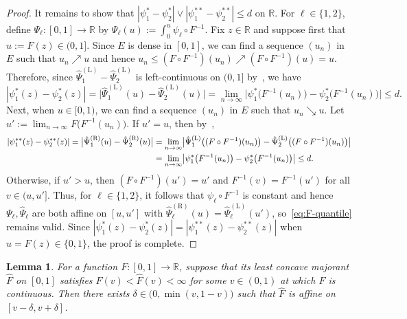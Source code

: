 \documentclass[a4paper]{article}
\newcommand{\R}{\mathbb{R}}
\newtheorem{lemma}[theorem]{Lemma}
\theoremstyle{definition}
\begin{document}
\begin{proof}
It remains to show that $|\psi_1^* - \psi_2^*| \vee |\psi_1^{**} - \psi_2^{**}| \leq d$ on $\R$. For $\ell \in \{1,2\}$, define $\Psi_\ell \colon [0,1] \to \R$ by $\Psi_\ell(u) := \int_0^u \psi_\ell \circ F^{-1}$. Fix $z \in \R$ and suppose first that $u := F(z) \in (0,1]$. Since $E$ is dense in $[0,1]$, we can find a sequence $(u_n)$ in $E$ such that $u_n \nearrow u$ and hence $u_n \leq (F \circ F^{-1})(u_n) \nearrow (F \circ F^{-1})(u) = u$. Therefore, since $\hat{\Psi}_1^{(\mathrm{L})} - \hat{\Psi}_2^{(\mathrm{L})}$ is left-continuous on $(0,1]$ by~\citet[Theorem~24.1]{rockafellar97convex}, we have
\[
|\psi_1^*(z) - \psi_2^*(z)| = \bigl|\hat{\Psi}_1^{(\mathrm{L})}(u) - \hat{\Psi}_2^{(\mathrm{L})}(u)\bigr| = \lim_{n \to \infty} \bigl|\psi_1^*\bigl(F^{-1}(u_n)\bigr) - \psi_2^*\bigl(F^{-1}(u_n)\bigr)\bigr| \leq d.
\]
Next, when $u \in [0,1)$, we can find a sequence $(u_n)$ in $E$ such that $u_n \searrow u$. Let $u' := \lim_{n \to \infty}F\bigl(F^{-1}(u_n)\bigr)$. 
If $u' = u$, then by~\citet[Theorem~24.1]{rockafellar97convex},
\begin{align}
|\psi_1^{**}(z) - \psi_2^{**}(z)| = \bigl|\hat{\Psi}_1^{(\mathrm{R})}(u) - \hat{\Psi}_2^{(\mathrm{R})}(u)\bigr| &= \lim_{n \to \infty}\bigl|\hat{\Psi}_1^{(\mathrm{L})}\bigl((F \circ F^{-1})(u_n)\bigr) - \hat{\Psi}_2^{(\mathrm{L})}\bigl((F \circ F^{-1})(u_n)\bigr)\bigr| \notag \\
\label{eq:F-quantile}
&= \lim_{n \to \infty} \bigl|\psi_1^*\bigl(F^{-1}(u_n)\bigr) - \psi_2^*\bigl(F^{-1}(u_n)\bigr)\bigr| \leq d.
\end{align}
Otherwise, if $u' > u$, then $(F \circ F^{-1})(u') = u'$ and $F^{-1}(v) = F^{-1}(u')$ for all $v \in (u,u']$. Thus, for $\ell \in \{1,2\}$, it follows that $\psi_\ell \circ F^{-1}$ is constant and hence $\Psi_\ell,\hat{\Psi}_\ell$ are both affine on $[u,u']$ with $\hat{\Psi}_\ell^{(\mathrm{R})}(u) = \hat{\Psi}_\ell^{(\mathrm{L})}(u')$, so~\eqref{eq:F-quantile} remains valid. Since $|\psi_1^*(z) - \psi_2^*(z)| = |\psi_1^{**}(z) - \psi_2^{**}(z)|$ when $u = F(z) \in \{0,1\}$, the proof is complete.
\end{proof}

\begin{lemma}
\label{lem:lcm-affine}
For a function $F \colon [0,1] \to \R$, suppose that its least concave majorant $\hat{F}$ on $[0,1]$ satisfies $F(v) < \hat{F}(v) < \infty$ for some $v \in (0,1)$ at which $F$ is continuous. Then there exists $\delta \in \bigl(0,\min(v, 1 - v)\bigr)$ such that $\hat{F}$ is affine on $[v - \delta, v + \delta]$.
\end{lemma}
\end{document}
